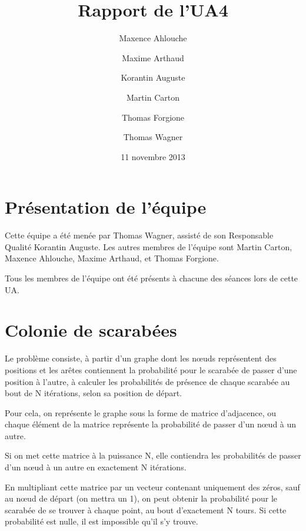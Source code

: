 \documentclass{scrartcl}
\begin{document}
\title{Rapport de l'UA4}
\author{Maxence Ahlouche \and Maxime Arthaud \and Korantin Auguste
          \and Martin Carton \and Thomas Forgione \and Thomas Wagner}
\date{11 novembre 2013}
\maketitle
\tableofcontents
\newpage

\section{Présentation de l'équipe}
  Cette équipe a été menée par Thomas Wagner, assisté de son Responsable
  Qualité Korantin Auguste. Les autres membres de l'équipe sont Martin Carton,
  Maxence Ahlouche, Maxime Arthaud, et Thomas Forgione.

  Tous les membres de l'équipe ont été présents à chacune des séances lors de
  cette UA.

\section{Colonie de scarabées}

  Le problème consiste,  à partir d'un graphe dont les nœuds représentent des
  positions et les arêtes contiennent la probabilité pour le scarabée de passer
  d'une position à l'autre, à calculer les probabilités de présence de chaque scarabée
  au bout de N itérations, selon sa position de départ.

  Pour cela, on représente le graphe sous la forme de matrice d'adjacence, ou chaque
  élément de la matrice représente la probabilité de passer d'un nœud à un autre.

  Si on met cette matrice à la puissance N, elle contiendra les probabilités de passer
  d'un nœud à un autre en exactement N itérations.

  En multipliant cette matrice par un vecteur contenant uniquement des zéros, sauf au nœud
  de départ (on mettra un 1), on peut obtenir la probabilité pour le scarabée de se trouver
  à chaque point, au bout d'exactement N tours.
  Si cette probabilité est nulle, il est impossible qu'il s'y trouve.
\end{document}
